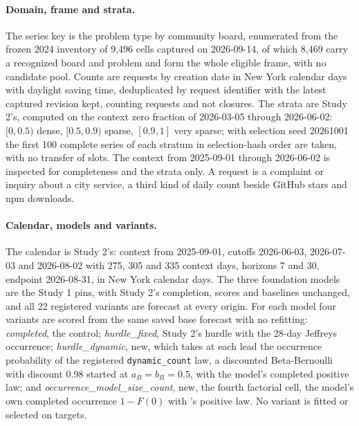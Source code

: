 \paragraph{Domain, frame and strata.} The series key is the problem type by community board, enumerated
from the frozen 2024 inventory of 9,496 cells captured on 2026-09-14, of which 8,469 carry a recognized
board and problem and form the whole eligible frame, with no candidate pool. Counts are requests by
creation date in New York calendar days with daylight saving time, deduplicated by request identifier with
the latest captured revision kept, counting requests and not closures. The strata are Study 2's, computed
on the context zero fraction of 2026-03-05 through 2026-06-02: $[0, 0.5)$ dense, $[0.5, 0.9)$ sparse,
$[0.9, 1]$ very sparse; with selection seed 20261001 the first 100 complete series of each stratum in
selection-hash order are taken, with no transfer of slots. The context from 2025-09-01 through 2026-06-02
is inspected for completeness and the strata only. A request is a complaint or inquiry about a city
service, a third kind of daily count beside GitHub stars and npm downloads.

\paragraph{Calendar, models and variants.} The calendar is Study 2's: context from 2025-09-01, cutoffs
2026-06-03, 2026-07-03 and 2026-08-02 with 275, 305 and 335 context days, horizons 7 and 30, endpoint
2026-08-31, in New York calendar days. The three foundation models are the Study 1 pins, with Study 2's
completion, scores and baselines unchanged, and all 22 registered variants are forecast at every origin.
For each model four variants are scored from the same saved base forecast with no refitting:
\emph{completed}, the control; \emph{hurdle\_fixed}, Study 2's hurdle with the 28-day Jeffreys occurrence;
\emph{hurdle\_dynamic}, new, which takes at each lead the occurrence probability of the registered
\texttt{dynamic\_count} law, a discounted Beta-Bernoulli with discount 0.98 started at $a_B = b_B = 0.5$, with
the model's completed positive law; and \emph{occurrence\_model\_size\_count}, new, the fourth factorial
cell, the model's own completed occurrence $1 - F(0)$ with \hc{}'s positive law. No variant is fitted or
selected on targets.

